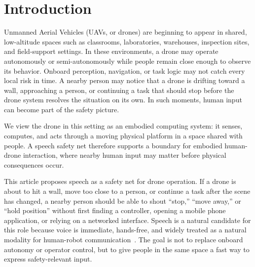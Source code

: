 \section{Introduction}
Unmanned Aerial Vehicles (UAVs, or drones) are beginning to appear in shared, low-altitude spaces such as classrooms, laboratories, warehouses, inspection sites, and field-support settings. In these environments, a drone may operate autonomously or semi-autonomously while people remain close enough to observe its behavior. Onboard perception, navigation, or task logic may not catch every local risk in time. A nearby person may notice that a drone is drifting toward a wall, approaching a person, or continuing a task that should stop before the drone system resolves the situation on its own. In such moments, human input can become part of the safety picture.

We view the drone in this setting as an embodied computing system: it senses, computes, and acts through a moving physical platform in a space shared with people. A speech safety net therefore supports a boundary for embodied human-drone interaction, where nearby human input may matter before physical consequences occur.

This article proposes speech as a safety net for drone operation. If a drone is about to hit a wall, move too close to a person, or continue a task after the scene has changed, a nearby person should be able to shout ``stop,'' ``move away,'' or ``hold position'' without first finding a controller, opening a mobile phone application, or relying on a networked interface. Speech is a natural candidate for this role because voice is immediate, hands-free, and widely treated as a natural modality for human-robot communication~\cite{moore2022vocal}. The goal is not to replace onboard autonomy or operator control, but to give people in the same space a fast way to express safety-relevant input.


